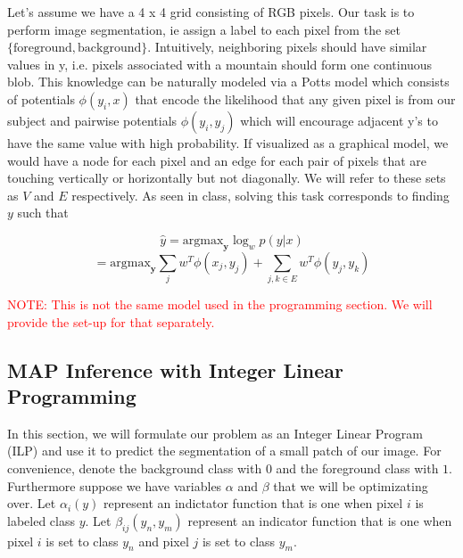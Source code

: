 \documentclass[11pt,addpoints,answers]{exam}
\numberwithin{equation}{section} %
\numberwithin{figure}{section} %
\numberwithin{table}{section} %
\begin{document}
Let's assume we have a 4 x 4 grid consisting of RGB pixels. Our task is to perform image segmentation, ie assign a label to each pixel from the set $\{\text{foreground}, \text{background}\}$. Intuitively, neighboring pixels should have similar values in y, i.e. pixels associated with a mountain should form one continuous blob. This knowledge can be naturally modeled via a Potts model which consists of potentials $\phi(y_i,x)$ that encode the likelihood that any given pixel is from our subject and  pairwise potentials $\phi(y_i,y_j)$ which will encourage adjacent 
y’s to have the same value with high probability. If visualized as a graphical model, we would have a node for each pixel and an edge for each pair of pixels that are touching vertically or horizontally but not diagonally. We will refer to these sets as $V$ and $E$ respectively.  
\newline
As seen in class, solving this task corresponds to finding $y$ such that

$$\hat{y} = \text{argmax}_{\boldsymbol{y}} \log_w p(y |x) $$
 $$=\text{argmax}_{\boldsymbol{y}}
 \sum_{j} w^T \phi(x_j, y_j) +
  \sum_{j,k \in E} w^T \phi(y_j, y_k)
 $$

\textcolor{red}{NOTE: This is not the same model used in the programming section. We will provide the set-up for that separately.}

\subsection{MAP Inference with Integer Linear Programming}

In this section, we will formulate our problem as an Integer Linear Program (ILP) and use it to predict the segmentation of a small patch of our image. For convenience, denote the background class with $0$ and the foreground class with $1$. Furthermore suppose we have variables $\alpha$ and $\beta$ that we will be optimizating over.  Let $\alpha_i(y)$ represent an indictator function that is one when pixel $i$ is labeled class $y$. Let $\beta_{ij}(y_n, y_m)$ represent an indicator function that is one when pixel $i$ is set to class $y_n$ and pixel $j$ is set to class $y_m$. 
\end{document}

